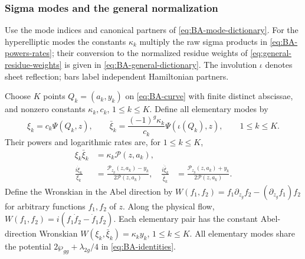 \subsubsection{Sigma modes and the general normalization}

Use the mode indices and canonical partners of
\cref{eq:BA-mode-dictionary}. For the hyperelliptic modes the constants
$\kappa_k$ multiply the raw sigma products in
\cref{eq:BA-powers-rates}; their conversion to the normalized
residue weights of \cref{eq:general-residue-weights} is given in
\cref{eq:BA-general-dictionary}. The involution $\iota$ denotes sheet reflection; bars label independent Hamiltonian partners.

Choose $K$ points $Q_k=(a_k,y_k)$ on \cref{eq:BA-curve} with
finite distinct abscissae, and nonzero constants $\kappa_k,c_k$,
$1\leq k\leq K$. Define all elementary modes by
\begin{equation}\label{eq:BA-elementary}
 \xi_k=c_k\Psi(Q_k,z),\qquad
 \bar{\xi}_k=\frac{(-1)^g\kappa_k}{c_k}\Psi(\iota(Q_k),z),
 \qquad1\leq k\leq K.
\end{equation}
Their powers and logarithmic rates are, for $1\leq k\leq K$,
\begin{equation}\label{eq:BA-powers-rates}
\begin{aligned}
 \xi_k\bar{\xi}_k&=\kappa_k\mathcal P(z,a_k),\\
 \frac{i\dot\xi_k}{\xi_k}
 &=\frac{\mathcal P_{z_g}(z,a_k)-y_k}{2\mathcal P(z,a_k)},&
 \frac{i\dot{\bar{\xi}}_k}{\bar{\xi}_k}
 &=\frac{\mathcal P_{z_g}(z,a_k)+y_k}{2\mathcal P(z,a_k)}.
\end{aligned}
\end{equation}
Define the Wronskian in the Abel direction by
$W(f_1,f_2)=f_1\partial_{z_g}f_2-(\partial_{z_g}f_1)f_2$
for arbitrary functions $f_1,f_2$ of $z$. Along the physical flow,
$W(f_1,f_2)=i(f_1\dot f_2-\dot f_1f_2)$.
Each elementary pair has the constant Abel-direction Wronskian
$W(\xi_k,\bar\xi_k)=\kappa_k y_k$, $1\leq k\leq K$.
All elementary modes share the potential
$2\wp_{gg}+\lambda_{2g}/4$ in \cref{eq:BA-identities}.


